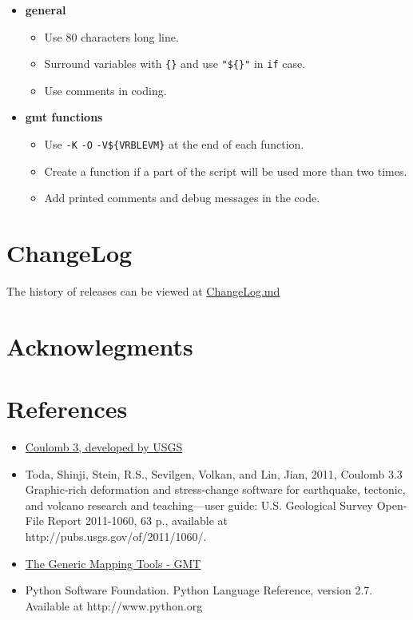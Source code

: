 \begin{itemize}

\item
  \textbf{general}

  \begin{itemize}
  
  \item
    Use 80 characters long line.
  \item
    Surround variables with \texttt{\{\}} and use \texttt{"\$\{\}"} in
    \texttt{if} case.
  \item
    Use comments in coding.
  \end{itemize}
\item
  \textbf{gmt functions}

  \begin{itemize}
  
  \item
    Use \texttt{-K} \texttt{-O} \texttt{-V\$\{VRBLEVM\}} at the end of
    each function.
  \item
    Create a function if a part of the script will be used more than two
    times.
  \item
    Add printed comments and debug messages in the code.
  \end{itemize}
\end{itemize}

\section{ChangeLog}\label{changelog}

The history of releases can be viewed at
\href{docs/ChangeLog.md}{ChangeLog.md}

\section{Acknowlegments}\label{acknowlegments}

\section{References}\label{references}

\begin{itemize}
\item
  \href{https://earthquake.usgs.gov/research/software/coulomb/}{Coulomb
  3, developed by USGS}
\item
  Toda, Shinji, Stein, R.S., Sevilgen, Volkan, and Lin, Jian, 2011,
  Coulomb 3.3 Graphic-rich deformation and stress-change software for
  earthquake, tectonic, and volcano research and teaching---user guide:
  U.S. Geological Survey Open-File Report 2011-1060, 63 p., available at
  http://pubs.usgs.gov/of/2011/1060/.
\item
  \href{http://gmt.soest.hawaii.edu/}{The Generic Mapping Tools - GMT}
\item
  Python Software Foundation. Python Language Reference, version 2.7.
  Available at http://www.python.org
\end{itemize}
